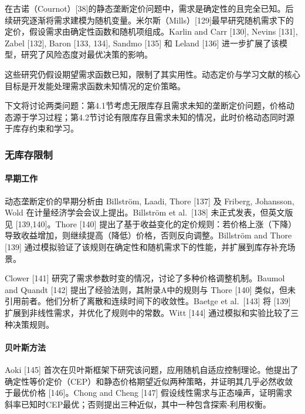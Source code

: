在古诺（Cournot）{[}38{]}的静态垄断定价问题中，需求是确定性的且完全已知。后续研究逐渐将需求建模为随机变量。米尔斯（Mills）{[}129{]}最早研究随机需求下的定价，假设需求由确定性函数和随机项组成。Karlin and Carr {[}130{]}, Nevins {[}131{]}, Zabel {[}132{]}, Baron {[}133, 134{]}, Sandmo {[}135{]} 和 Leland {[}136{]} 进一步扩展了该模型，研究了风险态度对最优决策的影响。

这些研究仍假设期望需求函数已知，限制了其实用性。动态定价与学习文献的核心目标是开发能处理需求函数未知情况的定价策略。

下文将讨论两类问题：第4.1节考虑无限库存且需求未知的垄断定价问题，价格动态源于学习过程；第4.2节讨论有限库存且需求未知的情况，此时价格动态同时源于库存约束和学习。

\subsubsection{无库存限制}\label{no-inventory-restrictions}

\paragraph{早期工作}\label{early-work}

动态垄断定价的早期分析由 Billström, Laadi, Thore {[}137{]} 及 Friberg, Johansson, Wold 在计量经济学会会议上提出。Billström et al.~{[}138{]} 未正式发表，但英文版见 {[}139,140{]}。Thore {[}140{]} 提出了基于收益变化的定价规则：若价格上涨（下降）导致收益增加，则继续提高（降低）价格，否则反向调整。Billström and Thore {[}139{]} 通过模拟验证了该规则在确定性和随机需求下的性能，并扩展到库存补充场景。

Clower {[}141{]} 研究了需求参数时变的情况，讨论了多种价格调整机制。Baumol and Quandt {[}142{]} 提出了经验法则，其附录A中的规则与 Thore {[}140{]} 类似，但未引用前者。他们分析了离散和连续时间下的收敛性。Baetge et al.~{[}143{]} 将 {[}139{]} 扩展到非线性需求，并优化了规则中的常数。Witt {[}144{]} 通过模拟和实验比较了三种决策规则。

\paragraph{贝叶斯方法}\label{bayesian-approaches}

Aoki {[}145{]} 首次在贝叶斯框架下研究该问题，应用随机自适应控制理论。他提出了确定性等价定价（CEP）和静态价格期望近似两种策略，并证明其几乎必然收敛于最优价格 {[}146{]}。Chong and Cheng {[}147{]} 假设线性需求与正态噪声，证明需求斜率已知时CEP最优；否则提出三种近似，其中一种包含探索-利用权衡。

